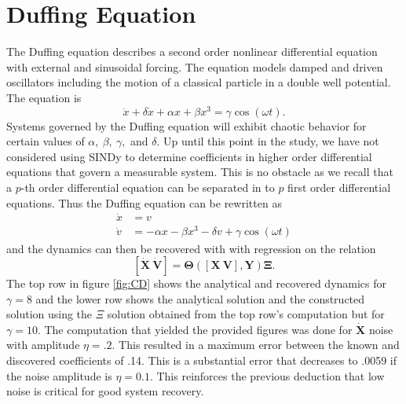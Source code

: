 \documentclass[%
 aip,12pt,
rsi,%
 amsmath,amssymb,
 reprint,%
]{revtex4-1}
\begin{document}
{\section{Duffing Equation}
The Duffing equation describes a second order nonlinear differential equation with external and sinusoidal forcing. The equation models damped and driven oscillators including the motion of a classical particle in a double well potential. The equation is
\begin{equation}
  \ddot x + \delta \dot x + \alpha x + \beta x^3 = \gamma \cos(\omega t).
\end{equation}
Systems governed by the Duffing equation will exhibit chaotic behavior for certain values of $\alpha,\ \beta,\ \gamma,$ and $\delta$.
Up until this point in the study, we have not considered using SINDy to determine coefficients in higher order differential equations that govern a measurable system. This is no obstacle as we recall that a $p$-th order differential equation can be separated in to $p$ first order differential equations. Thus the Duffing equation can be rewritten as 
\begin{align}
  \dot x &= v \\
  \dot v &= -\alpha x -\beta  x^3 - \delta v + \gamma \cos(\omega t)
\end{align}
and the dynamics can then be recovered with with regression on the relation
\begin{equation}
    \bm{[\dot{X}\ \dot{V}]} = \bm{\Theta}(\bm{[X\ V]},\bm{Y})\bm{\Xi}.
\end{equation}
The top row in figure \ref{fig:CD} shows the analytical and recovered dynamics for $\gamma = 8$ and the lower row shows the analytical solution and the constructed solution using the $\Xi$ solution obtained from the top row's computation but for $\gamma=10$. The computation that yielded the provided figures was done for $\bm{\dot{X}}$ noise with amplitude $\eta=.2$. This resulted in a maximum error between the known and discovered coefficients of .14. This is a substantial error that decreases to .0059 if the noise amplitude is $\eta=0.1$. This reinforces the previous deduction that low noise is critical for good system recovery.


}
\end{document}
